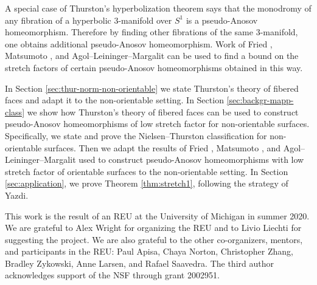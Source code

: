  A special case of Thurston's hyperbolization theorem says that the monodromy of any fibration of a hyperbolic 3-manifold over $S^1$ is a pseudo-Anosov homeomorphism.  Therefore by finding other fibrations of the same 3-manifold, one obtains additional pseudo-Anosov homeomorphism.  Work of Fried \cite{fried1982flow,fried1983transitive}, Matsumoto \cite{matsumoto1987topological}, and Agol--Leininger--Margalit \cite{agol6983pseudo} can be used to find a bound on the stretch factors of certain pseudo-Anosov homeomorphisms obtained in this way.


In Section \ref{sec:thur-norm-non-orientable} we state Thurston's theory of fibered faces and adapt it to the non-orientable setting.  In Section \ref{sec:backgr-mapp-class} we show how Thurston's theory of fibered faces can be used to construct pseudo-Anosov homeomorphisms of low stretch factor for non-orientable surfaces.  Specifically, we state and prove the Nielsen--Thurston classification for non-orientable surfaces.  Then we adapt the results of Fried \cite{fried1982flow,fried1983transitive}, Matsumoto \cite{matsumoto1987topological}, and Agol--Leininger--Margalit \cite{agol6983pseudo} used to construct pseudo-Anosov homeomorphisms with low stretch factor of orientable surfaces to the non-orientable setting.  In Section \ref{sec:application}, we prove Theorem \ref{thm:stretch1}, following the strategy of Yazdi.

This work is the result of an REU at the University of Michigan in summer 2020.  We are grateful to Alex Wright for organizing the REU and to Livio Liechti for suggesting the project.  We are also grateful to the other co-organizers, mentors, and participants in the REU: Paul Apisa, Chaya Norton, Christopher Zhang, Bradley Zykowski, Anne Larsen, and Rafael Saavedra.  The third author acknowledges support of the NSF through grant 2002951.


